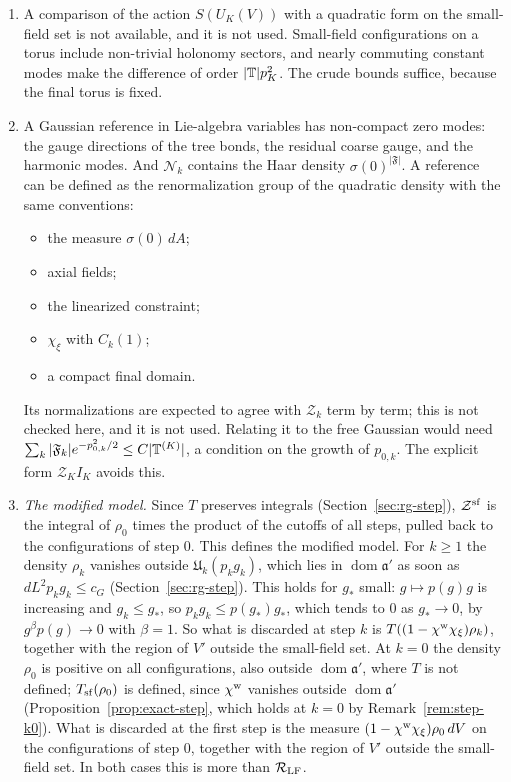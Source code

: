 \begin{remark}\label{rem:sf-reference}
\begin{enumerate}[label=(\alph*)]
\item A comparison of the action $S(U_K(V))$ with a quadratic form on the small-field set is not available, and it is not used. Small-field configurations on a torus include non-trivial holonomy sectors, and nearly commuting constant modes make the difference of order $|\mathbb T|p_K^2$. The crude bounds suffice, because the final torus is fixed.
\item A Gaussian reference in Lie-algebra variables has non-compact zero modes: the gauge directions of the tree bonds, the residual coarse gauge, and the harmonic modes. And $\mathcal N_k$ contains the Haar density $\sigma(0)^{|\mathfrak F|}$. A reference can be defined as the renormalization group of the quadratic density with the same conventions:
  \begin{itemize}
  \item the measure $\sigma(0)\,dA$;
  \item axial fields;
  \item the linearized constraint;
  \item $\chi_\xi$ with $C_k(1)$;
  \item a compact final domain.
  \end{itemize}
  Its normalizations are expected to agree with $\mathcal Z_k$ term by term; this is not checked here, and it is not used. Relating it to the free Gaussian would need $\sum_k|\mathfrak F_k|e^{-p_{0,k}^2/2}\le C|\mathbb T^{(K)}|$, a condition on the growth of $p_{0,k}$. The explicit form $\mathcal Z_KI_K$ avoids this.
\item \emph{The modified model.} Since $T$ preserves integrals (Section~\ref{sec:rg-step}), $\mathcal Z^{\rm sf}$ is the integral of $\rho_0$ times the product of the cutoffs of all steps, pulled back to the configurations of step $0$. This defines the modified model. For $k\ge1$ the density $\rho_k$ vanishes outside $\mathfrak U_k(p_kg_k)$, which lies in $\operatorname{dom}\mathfrak a'$ as soon as $dL^2p_kg_k\le c_G$ (Section~\ref{sec:rg-step}). This holds for $g_*$ small: $g\mapsto p(g)g$ is increasing and $g_k\le g_*$, so $p_kg_k\le p(g_*)g_*$, which tends to $0$ as $g_*\to0$, by $g^\beta p(g)\to0$ with $\beta=1$. So what is discarded at step $k$ is $T((1-\chi^{\rm w}\chi_\xi)\rho_k)$, together with the region of $V'$ outside the small-field set. At $k=0$ the density $\rho_0$ is positive on all configurations, also outside $\operatorname{dom}\mathfrak a'$, where $T$ is not defined; $T_{\rm sf}(\rho_0)$ is defined, since $\chi^{\rm w}$ vanishes outside $\operatorname{dom}\mathfrak a'$ (Proposition~\ref{prop:exact-step}, which holds at $k=0$ by Remark~\ref{rem:step-k0}). What is discarded at the first step is the measure $(1-\chi^{\rm w}\chi_\xi)\rho_0\,dV$ on the configurations of step $0$, together with the region of $V'$ outside the small-field set. In both cases this is more than $\mathcal R_{\rm LF}$.

\end{enumerate}
\end{remark}
